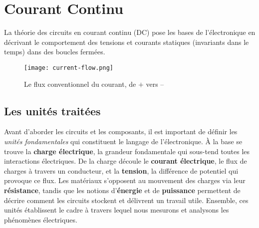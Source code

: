 \chapter{Courant Continu} \label{subsec:dc_circuit_theory}
La th\'eorie des circuits en courant continu (DC) pose les bases de l'\'electronique en d\'ecrivant le comportement des tensions et courants statiques (invariants dans le temps) dans des boucles ferm\'ees.\\
\begin{figure}[!h]
  \centering
  \texttt{[image: current-flow.png]}
  \caption{Le flux conventionnel du courant, de \(+\) vers --}
\end{figure}

\section{Les unit\'es trait\'ees} \label{subsec:units}
Avant d'aborder les circuits et les composants, il est important de d\'efinir les \textit{unit\'es fondamentales} qui constituent le langage de l'\'electronique. À la base se trouve la \textbf{charge \'electrique}, la grandeur fondamentale qui sous-tend toutes les interactions \'electriques. De la charge d\'ecoule le \textbf{courant \'electrique}, le flux de charges à travers un conducteur, et la \textbf{tension}, la diff\'erence de potentiel qui provoque ce flux. Les mat\'eriaux s'opposent au mouvement des charges via leur \textbf{r\'esistance}, tandis que les notions d'\textbf{\'energie} et de \textbf{puissance} permettent de d\'ecrire comment les circuits stockent et d\'elivrent un travail utile. Ensemble, ces unit\'es \'etablissent le cadre à travers lequel nous mesurons et analysons les ph\'enom\`enes \'electriques.\par
\vspace{\baselineskip}

